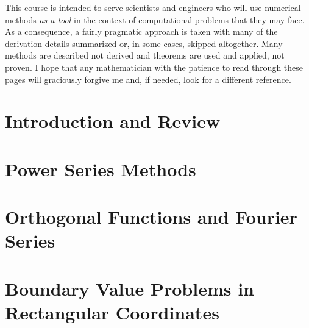 \documentclass{tufte-book}
\theoremstyle{break}
\begin{document}
This course is intended to serve scientists and engineers who will use numerical methods \emph{as a tool} in the context of computational problems that they may face.  As a consequence, a fairly pragmatic approach is taken with many of the derivation details summarized or, in some cases, skipped altogether.  Many methods are described not derived and theorems are used and applied, not proven.  I hope that any mathematician with the patience to read through these pages will graciously forgive me and, if needed, look for a different reference.

\mainmatter

\part{Introduction and Review}










\part{Power Series Methods}













\part{Orthogonal Functions and Fourier Series}









\part{Boundary Value Problems in Rectangular Coordinates}













\end{document}
